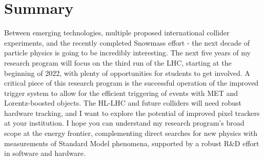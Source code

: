 \documentclass[10pt,a4paper,sans]{moderncv} %
\begin{document}
\section{Summary}
Between emerging technologies, multiple proposed international collider experiments, and the recently completed Snowmass effort - the next decade of particle physics is going to be incredibly interesting. The next five years of my research program will focus on the third run of the LHC, starting at the beginning of 2022, with plenty of opportunities for students to get involved. A critical piece of this research program is the successful operation of the improved trigger system to allow for the efficient triggering of events with MET and Lorentz-boosted objects. The HL-LHC and future colliders will need robust hardware tracking, and I want to explore the potential of improved pixel trackers at your institution.  I hope you can understand my research program's broad scope at the energy frontier, complementing direct searches for new physics with measurements of Standard Model phenomena, supported by a robust R\&D effort in software and hardware.
%
\printbibliography
\end{document}
